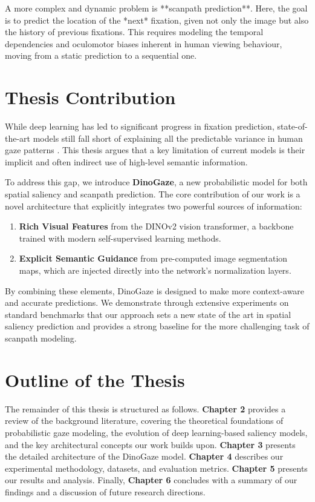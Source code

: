 A more complex and dynamic problem is **scanpath prediction**. Here, the goal is to predict the location of the *next* fixation, given not only the image but also the history of previous fixations. This requires modeling the temporal dependencies and oculomotor biases inherent in human viewing behaviour, moving from a static prediction to a sequential one.

\section{Thesis Contribution}
\label{sec:intro_contribution}

While deep learning has led to significant progress in fixation prediction, state-of-the-art models still fall short of explaining all the predictable variance in human gaze patterns \cite{kummerer2023predicting, kummerer2022deepgaze}. This thesis argues that a key limitation of current models is their implicit and often indirect use of high-level semantic information.

To address this gap, we introduce \textbf{DinoGaze}, a new probabilistic model for both spatial saliency and scanpath prediction. The core contribution of our work is a novel architecture that explicitly integrates two powerful sources of information:
\begin{enumerate}
    \item \textbf{Rich Visual Features} from the DINOv2 vision transformer, a backbone trained with modern self-supervised learning methods.
    \item \textbf{Explicit Semantic Guidance} from pre-computed image segmentation maps, which are injected directly into the network's normalization layers.
\end{enumerate}
By combining these elements, DinoGaze is designed to make more context-aware and accurate predictions. We demonstrate through extensive experiments on standard benchmarks that our approach sets a new state of the art in spatial saliency prediction and provides a strong baseline for the more challenging task of scanpath modeling.

\section{Outline of the Thesis}
\label{sec:intro_outline}

The remainder of this thesis is structured as follows. \textbf{Chapter 2} provides a review of the background literature, covering the theoretical foundations of probabilistic gaze modeling, the evolution of deep learning-based saliency models, and the key architectural concepts our work builds upon. \textbf{Chapter 3} presents the detailed architecture of the DinoGaze model. \textbf{Chapter 4} describes our experimental methodology, datasets, and evaluation metrics. \textbf{Chapter 5} presents our results and analysis. Finally, \textbf{Chapter 6} concludes with a summary of our findings and a discussion of future research directions.



